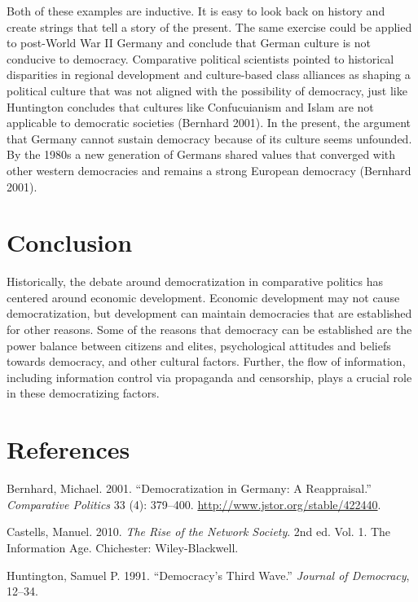 \documentclass[12pt,]{article}
\begin{document}
Both of these examples are inductive. It is easy to look back on history
and create strings that tell a story of the present. The same exercise
could be applied to post-World War II Germany and conclude that German
culture is not conducive to democracy. Comparative political scientists
pointed to historical disparities in regional development and
culture-based class alliances as shaping a political culture that was
not aligned with the possibility of democracy, just like Huntington
concludes that cultures like Confucuianism and Islam are not applicable
to democratic societies (Bernhard 2001). In the present, the argument
that Germany cannot sustain democracy because of its culture seems
unfounded. By the 1980s a new generation of Germans shared values that
converged with other western democracies and remains a strong European
democracy (Bernhard 2001).

\hypertarget{conclusion}{%
\section{Conclusion}\label{conclusion}}

Historically, the debate around democratization in comparative politics
has centered around economic development. Economic development may not
cause democratization, but development can maintain democracies that are
established for other reasons. Some of the reasons that democracy can be
established are the power balance between citizens and elites,
psychological attitudes and beliefs towards democracy, and other
cultural factors. Further, the flow of information, including
information control via propaganda and censorship, plays a crucial role
in these democratizing factors.

\hypertarget{references}{%
\section*{References}\label{references}}

\hypertarget{refs}{}
\leavevmode\hypertarget{ref-bernhard}{}%
Bernhard, Michael. 2001. ``Democratization in Germany: A Reappraisal.''
\emph{Comparative Politics} 33 (4): 379--400.
\url{http://www.jstor.org/stable/422440}.

\leavevmode\hypertarget{ref-castells}{}%
Castells, Manuel. 2010. \emph{The Rise of the Network Society}. 2nd ed.
Vol. 1. The Information Age. Chichester: Wiley-Blackwell.

\leavevmode\hypertarget{ref-huntington}{}%
Huntington, Samuel P. 1991. ``Democracy's Third Wave.'' \emph{Journal of
Democracy}, 12--34.
\end{document}
